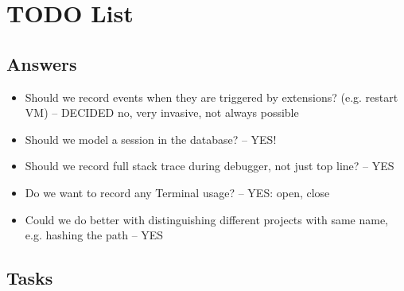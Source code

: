 \documentclass{book}
\begin{document}
\chapter{TODO List}

\section{Answers}

\begin{itemize}
\item Should we record events when they are triggered by extensions?
  (e.g. restart VM) -- DECIDED no, very invasive, not always possible
\item Should we model a session in the database? -- YES!
\item Should we record full stack trace during debugger, not just top line? -- YES
\item Do we want to record any Terminal usage? -- YES: open, close
\item Could we do better with distinguishing different projects with same
  name, e.g. hashing the path -- YES
\end{itemize}

\section{Tasks}
\end{document}
